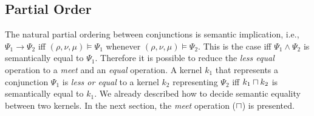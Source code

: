 \subsection{Partial Order}

The natural partial ordering between conjunctions is semantic implication, i.e.,
$\Psi_1 \rightarrow \Psi_2$
iff $(\rho, \nu, \mu) \models \Psi_1$ whenever $(\rho, \nu, \mu) \models \Psi_2$.
This is the case iff $\Psi_1 \land \Psi_2$ is semantically equal to $\Psi_1$.
Therefore it is possible to reduce the \emph{less equal} operation to a \emph{meet} and an \emph{equal} operation.
A kernel $k_1$ that represents a conjunction $\Psi_1$ is \emph{less or equal} to a kernel $k_2$ representing $\Psi_2$ iff
$k_1 \sqcap k_2$ is semantically equal to $k_1$.
We already described how to decide semantic equality between two kernels.
In the next section, the \emph{meet} operation ($\sqcap$) is presented.
